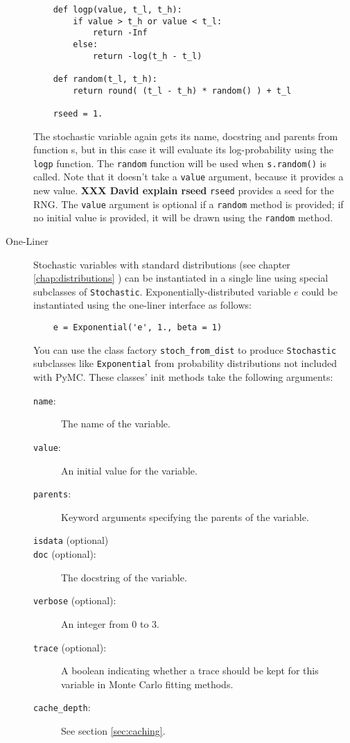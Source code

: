 \begin{description}
\begin{verbatim}
    def logp(value, t_l, t_h):
        if value > t_h or value < t_l:
            return -Inf
        else:
            return -log(t_h - t_l) 
            
    def random(t_l, t_h):
        return round( (t_l - t_h) * random() ) + t_l

    rseed = 1.
    \end{verbatim}
The stochastic variable again gets its name, docstring and parents from function s, but in this case it will evaluate its log-probability using the \texttt{logp} function. The \texttt{random} function will be used when \texttt{s.random()} is called. Note that it doesn't take a \texttt{value} argument, because it provides a new value. \textbf{XXX David explain rseed} \texttt{rseed} provides a seed for the RNG. The \texttt{value} argument is optional if a \texttt{random} method is provided; if no initial value is provided, it will be drawn using the \texttt{random} method.

\item[One-Liner] Stochastic variables with standard distributions (see chapter \ref{chap:distributions} ) can be instantiated in a single line using special subclasses of \texttt{Stochastic}. Exponentially-distributed variable $e$ could be instantiated using the one-liner interface as follows:
\begin{verbatim}
    e = Exponential('e', 1., beta = 1)
\end{verbatim}
You can use the class factory \texttt{stoch_from_dist} to produce \texttt{Stochastic} subclasses like \texttt{Exponential} from probability distributions not included with PyMC. These classes' init methods take the following arguments:
\begin{description}
    \item[\texttt{name}:] The name of the variable.
    \item[\texttt{value}:] An initial value for the variable.
    \item[\texttt{parents}:] Keyword arguments specifying the parents of the variable.
    \item[\texttt{isdata} (optional)]
    \item[\texttt{doc} (optional):] The docstring of the variable.
    \item[\texttt{verbose} (optional):] An integer from 0 to 3.
    \item[\texttt{trace} (optional):] A boolean indicating whether a trace should be kept for this variable in Monte Carlo fitting methods.
    \item[\texttt{cache_depth}:] See section \ref{sec:caching}. 
\end{description}



\end{description}
